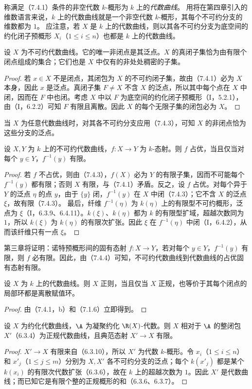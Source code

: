 称满足（7.4.1）条件的非空代数 $k$-概形为 $k$ 上的\emph{代数曲线}。
用将在第四章引入的维数语言来说，$k$ 上的代数曲线就是一个非空代数 $k$-概形，其每个不可约分支的维数都为 $1$。
应注意，若 $X$ 是 $k$ 上的代数曲线，则以其各不可约分支为底空间的约化闭子预概形 $X_i$（$1\leq i\leq n$）也都是 $k$ 上的代数曲线。

设 $X$ 为不可约代数曲线。它的唯一非闭点是其泛点。$X$ 的真闭子集恰为由有限个闭点组成的集合；它们也是 $X$ 中仅有的非处处稠密的子集。
\begin{proof}
若 $x\in X$ 不是闭点，其闭包为 $X$ 的不可约闭子集，故由（7.4.1）必为 $X$ 本身，因此 $x$ 是泛点。真闭子集 $F\ne X$ 不含 $X$ 的泛点，所以其中每个点在 $X$ 中闭，因而在 $F$ 中也闭。考虑 $X$ 中以 $F$ 为底空间的约化闭子预概形（I，5.2.1），由（I，6.2.2）可知 $F$ 有限且离散。因此 $X$ 的每个无限子集的闭包必为 $X$。
\end{proof}
当 $X$ 为任意代数曲线时，对其各不可约分支应用（7.4.3），可知 $X$ 的非闭点恰为这些分支的泛点。

设 $X,Y$ 为 $k$ 上的不可约代数曲线，$f:X\to Y$ 为 $k$-态射。则 $f$ 占优，当且仅当对每个 $y\in Y$，$f^{-1}(y)$ 有限。
\begin{proof}
若 $f$ 不占优，则由（7.4.3），$f(X)$ 必为 $Y$ 的有限子集，因而不可能每个 $f^{-1}(y)$ 都有限；否则 $X$ 有限，与（7.4.1）矛盾。反之，设 $f$ 占优。对每个异于 $Y$ 的泛点 $\eta$ 的点 $y$，由于 $\{y\}$ 闭，$f^{-1}(y)$ 在 $X$ 中闭（7.4.3）；它不含 $X$ 的泛点 $\xi$，故有限（7.4.3）。
最后，纤维 $f^{-1}(\eta)$ 为 $k(\eta)$ 上的有限型不可约概形，泛点为 $\xi$（I，6.3.9、6.4.11）。$k(\xi)$、$k(\eta)$ 都为 $k$ 的有限型扩域，超越次数同为 $1$，所以 $k(\xi)$ 为 $k(\eta)$ 的有限次扩张。因此 $\xi$ 在 $f^{-1}(\eta)$ 中闭（I，6.4.2），从而该纤维只有一点 $\xi$。
\end{proof}
第三章将证明：诺特预概形间的固有态射 $f:X\to Y$，若对每个 $y\in Y$，$f^{-1}(y)$ 有限，则 $f$ 必有限。因此，由（7.4.4）可知，不可约代数曲线到代数曲线的占优固有态射有限。

设 $X$ 为 $k$ 上的代数曲线。则 $X$ 正则，当且仅当 $X$ 正规，也等价于其每个闭点的局部环都是离散赋值环。
\begin{proof}
由（7.4.1，b）和（7.1.6）立即得到。
\end{proof}

设 $X$ 为约化代数曲线，$\A$ 为凝聚约化 $\R(X)$-代数。则 $X$ 相对于 $\A$ 的整闭包 $X'$（6.3.4）为正规代数曲线，且典范态射 $X'\to X$ 有限。
\begin{proof}
$X'\to X$ 有限来自（6.3.10），所以 $X'$ 为代数 $k$-概形。令 $x_i$（$1\leq i\leq n$）和 $x'_j$（$1\leq j\leq m$）分别为 $X,X'$ 各不可约分支的泛点；每个 $k(x'_j)$ 都是某个 $k(x_i)$ 的有限次代数扩张（6.3.6），故在 $k$ 上的超越次数为 $1$。因此 $X'$ 是代数曲线；而已知它是有限个整的正规概形的和（6.3.6、6.3.7）。
\end{proof}

